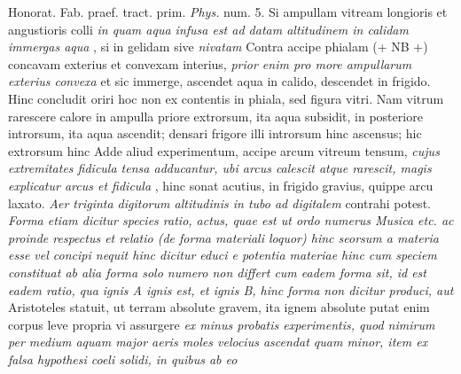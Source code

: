 \pend 
\pstart Honorat. Fab. praef. tract. prim. \textit{Phys.} num. 5. Si ampullam vitream\protect{} longioris et angustioris colli \textit{in quam aqua infusa est ad datam altitudinem in calidam immergas aqua} , si in gelidam sive \textit{nivatam}  Contra accipe phialam (+ NB +) concavam\protect{} exterius et convexam\protect{} interius, \textit{prior enim pro more ampullarum exterius convexa}  et sic immerge, ascendet aqua\protect{} in calido, descendet in frigido. Hinc concludit oriri hoc non ex contentis in phiala, sed figura vitri. Nam vitrum rarescere calore in ampulla priore extrorsum, ita aqua subsidit, in posteriore introrsum, ita aqua ascendit; densari frigore illi introrsum hinc ascensus; hic extrorsum hinc  Adde aliud experimentum, accipe arcum vitreum tensum, \textit{cujus extremitates fidicula tensa adducantur, ubi arcus calescit atque rarescit, magis explicatur arcus et fidicula} , hinc sonat acutius, in frigido gravius, quippe arcu laxato.\pend 
\pstart {} \textit{Aer\protect{} triginta digitorum altitudinis in tubo ad digitalem}  contrahi potest.\pend 
\pstart {} \textit{Forma etiam dicitur species ratio, actus, quae est ut ordo numerus Musica\protect{} etc. ac proinde respectus et relatio (de forma materiali loquor) hinc seorsum a materia esse vel concipi nequit hinc dicitur educi e potentia materiae hinc cum speciem constituat ab alia forma solo numero non differt cum eadem forma sit, id est eadem ratio, qua ignis\protect{} A ignis est, et ignis B, hinc forma non dicitur produci, aut} 
\pend 
\pstart {} Aristoteles\protect{} statuit, ut terram absolute gravem, ita ignem absolute  putat enim corpus leve propria vi assurgere \textit{ex minus probatis experimentis, quod nimirum per medium aquam major aeris moles velocius ascendat quam minor, item ex falsa hypothesi coeli solidi, in quibus ab eo} 
